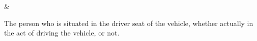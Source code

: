 


\Driver      & \begin{minipage}{\GlossaryColumnWidth}{%
The person who is situated in the driver seat of the vehicle, whether actually in the act of driving the vehicle, or not. 
}\end{minipage}\\ \hline%




